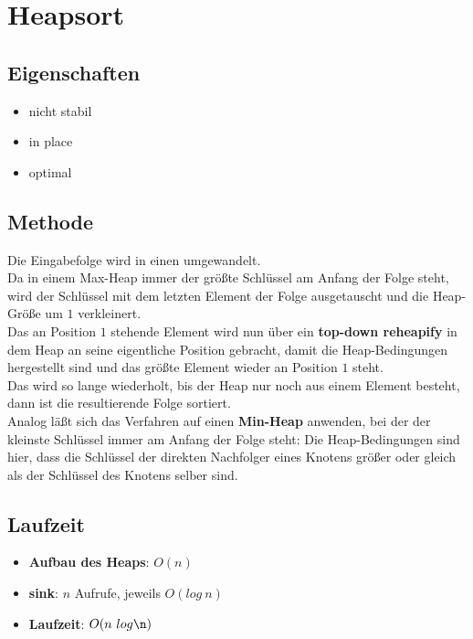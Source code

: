 \section{Heapsort}

\subsection{Eigenschaften}
\begin{itemize}
    \item nicht stabil
    \item in place
    \item optimal
\end{itemize}

\subsection{Methode}
Die Eingabefolge wird in einen  umgewandelt.\\
Da in einem Max-Heap immer der größte Schlüssel am Anfang der Folge steht, wird der Schlüssel mit dem letzten Element der Folge ausgetauscht und die Heap-Größe um $1$ verkleinert.\\
Das an Position $1$ stehende Element wird nun über ein \textbf{top-down reheapify} in dem Heap an seine eigentliche Position gebracht, damit die Heap-Bedingungen hergestellt sind und das größte Element wieder an Position $1$ steht.\\
Das wird so lange wiederholt, bis der Heap nur noch aus einem Element besteht, dann ist die resultierende Folge sortiert.\\

\noindent
Analog läßt sich das Verfahren auf einen \textbf{Min-Heap} anwenden, bei der der kleinste Schlüssel immer am Anfang der Folge steht: Die Heap-Bedingungen sind hier, dass die Schlüssel der direkten Nachfolger eines Knotens größer oder gleich als der Schlüssel des Knotens selber sind.



\subsection{Laufzeit}
\begin{itemize}
    \item \textbf{Aufbau des Heaps}: $O(n)$
    \item \textbf{sink}: $n$ Aufrufe, jeweils $O(log\ n)$
    \item \textbf{Laufzeit}: $O(n\ log \n)$
\end{itemize}